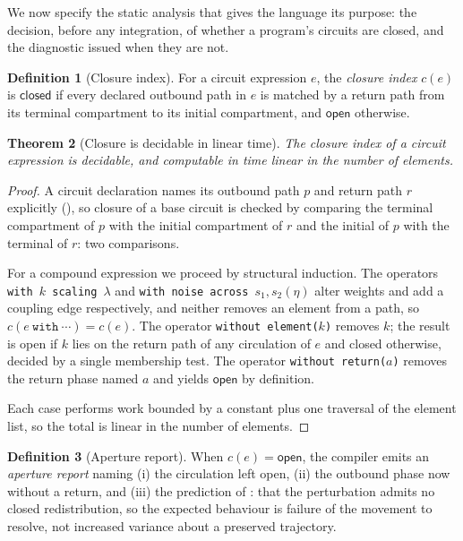 \documentclass[11pt,twocolumn,a4paper]{article}
\theoremstyle{thmstyle}
\newtheorem{theorem}{Theorem}[section]
\theoremstyle{definition}
\newtheorem{definition}[theorem]{Definition}
\theoremstyle{remark}
\begin{document}
We now specify the static analysis that gives the language its purpose: the
decision, before any integration, of whether a program's circuits are closed,
and the diagnostic issued when they are not.

\begin{definition}[Closure index]
\label{def:closure-index}
For a circuit expression $e$, the \emph{closure index} $c(e)$ is
$\textsf{closed}$ if every declared outbound path in $e$ is matched by a
return path from its terminal compartment to its initial compartment, and
$\textsf{open}$ otherwise.
\end{definition}

\begin{theorem}[Closure is decidable in linear time]
\label{thm:closure-decidable}
The closure index of a circuit expression is decidable, and computable in time
linear in the number of elements.
\end{theorem}

\begin{proof}
A circuit declaration names its outbound path $p$ and return path $r$
explicitly (), so closure of a base circuit is checked by
comparing the terminal compartment of $p$ with the initial compartment of $r$
and the initial of $p$ with the terminal of $r$: two comparisons.

For a compound expression we proceed by structural induction. The operators
\texttt{with $k$ scaling $\lambda$} and
\texttt{with noise across $s_1,s_2(\eta)$} alter weights and add a coupling
edge respectively, and neither removes an element from a path, so
$c(e\ \texttt{with}\ \cdots)=c(e)$. The operator
\texttt{without element($k$)} removes $k$; the result is open if $k$ lies on
the return path of any circulation of $e$ and closed otherwise, decided by a
single membership test. The operator \texttt{without return($a$)} removes the
return phase named $a$ and yields $\textsf{open}$ by definition.

Each case performs work bounded by a constant plus one traversal of the
element list, so the total is linear in the number of elements.
\end{proof}

\begin{definition}[Aperture report]
\label{def:aperture-report}
When $c(e)=\textsf{open}$, the compiler emits an \emph{aperture report} naming
(i) the circulation left open, (ii) the outbound phase now without a return,
and (iii) the prediction of : that the
perturbation admits no closed redistribution, so the expected behaviour is
failure of the movement to resolve, not increased variance about a preserved
trajectory.
\end{definition}
\end{document}
